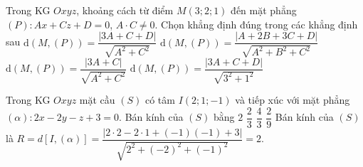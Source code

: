 \begin{ex}%
	Trong KG $Oxyz$, khoảng cách từ điểm $M(3;2;1)$ đến mặt phẳng $(P)\colon Ax+Cz+D=0$, $A\cdot C\ne 0$. Chọn khẳng định đúng trong các khẳng định sau
	\choice
	{\True $\mathrm{d}(M,(P))=\dfrac{|3A+C+D|}{\sqrt{A^2+C^2}}$}
	{$\mathrm{d}(M,(P))=\dfrac{|A+2B+3C+D|}{\sqrt{A^2+B^2+C^2}}$}
	{$\mathrm{d}(M,(P))=\dfrac{|3A+C|}{\sqrt{A^2+C^2}}$}
	{$\mathrm{d}(M,(P))=\dfrac{|3A+C+D|}{\sqrt{3^2+1^2}}$}
\end{ex}
\begin{ex}%
	Trong KG $Oxyz$ mặt cầu $(S)$ có tâm $I(2;1;-1)$ và tiếp xúc với mặt phẳng $(\alpha)\colon 2x-2y-z+3=0$. Bán kính của $(S)$ bằng
	\choice
	{\True $2$}
	{$\dfrac{2}{3}$}
	{$\dfrac{4}{3}$}
	{$\dfrac{2}{9}$}
	\loigiai
	{Bán kính của $(S)$ là $R=d[I,(\alpha)]=\dfrac{|2\cdot 2-2\cdot 1+(-1 )(-1 )+3|}{\sqrt{2^2+(-2)^2+(-1 )^2}}=2$.
	}
\end{ex}

